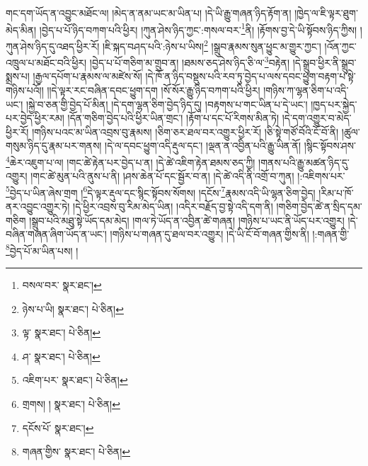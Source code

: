 གང་དག་ཡོད་ན་འབྱུང་མཐོང་ལ། །མེད་ན་ནམ་ཡང་མ་ཡིན་པ། །དེ་ཡི་རྒྱུ་གཞན་ཉིད་རྟོག་ན། །ཁྱེད་ལ་ཇི་ལྟར་ཐུག་མེད་མིན། །བྱེད་པ་པོ་ཉིད་བཀག་པའི་ཕྱིར། །ཀུན་ཤེས་ཉིད་ཀྱང་:གསལ་བར་\footnote{བསལ་བར་  སྣར་ཐང་། }ནི། །རྟོགས་བྱ་དེ་ཡི་སྟོབས་ཉིད་ཀྱིས། །ཀུན་ཤེས་ཉིད་དུ་འཐད་ཕྱིར་རོ། །ཇི་སྐད་བཤད་པའི་:ཉེས་པ་ཡིས།\footnote{ཉེས་པ་ཡི།  སྣར་ཐང་།  པེ་ཅིན། } །སྒྲུབ་རྣམས་སུན་ཕྱུང་མ་གྱུར་ཀྱང་། །འོན་ཀྱང་འཁྲུལ་པ་མཐོང་བའི་ཕྱིར། །བྱེད་པ་པོ་གཅིག་མ་གྲུབ་ན། །ཐམས་ཅད་ཤེས་ཉིད་ཅི་ལ་\footnote{ལྟ་  སྣར་ཐང་།  པེ་ཅིན། }བརྟེན། །དེ་སྒྲུབ་ཕྱིར་ནི་སྒྲུབ་སྨྲས་པ། །རྒྱལ་དཔོག་པ་རྣམས་ལ་མཛེས་སོ། །དེ་ཁོ་ན་ཉིད་བསྡུས་པའི་རབ་ཏུ་བྱེད་པ་ལས་དབང་ཕྱུག་བརྟག་པ་སྟེ་གཉིས་པའོ།། །།དེ་ལྟར་རང་བཞིན་དབང་ཕྱུག་དག །སོ་སོར་རྒྱུ་ཉིད་བཀག་པའི་ཕྱིར། །གཉིས་ཀ་ལྷན་ཅིག་པ་འདི་ཡང་། །སྐྱེ་བ་ཅན་གྱི་བྱེད་པོ་མིན། །དེ་དག་ལྷན་ཅིག་བྱེད་ཉིད་དུ། །བརྟགས་པ་གང་ཡིན་པ་དེ་ཡང་། །ཁྱད་པར་སྐྱེད་པར་བྱེད་ཕྱིར་རམ། །དོན་གཅིག་བྱེད་པའི་ཕྱིར་ཡིན་གྲང་། །རྟོག་པ་དང་པོ་རིགས་མིན་ཏེ། །དེ་དག་འགྱུར་བ་མེད་ཕྱིར་རོ། །གཉིས་པའང་མ་ཡིན་འབྲས་བུ་རྣམས། །ཅིག་ཅར་ཐལ་བར་འགྱུར་ཕྱིར་རོ། །ཅི་སྟེ་གཙོ་བོའི་ངོ་བོ་ནི། །ཚུལ་གསུམ་ཉིད་དུ་རྣམ་པར་གནས། །དེ་ལ་དབང་ཕྱུག་འདི་རྡུལ་དང་། །ལྡན་ན་འབྱིན་པའི་རྒྱུ་ཡིན་ནོ། །སྙིང་སྟོབས་ཤས་\footnote{ཤ་  སྣར་ཐང་།  པེ་ཅིན། }ཆེར་འཇུག་པ་ལ། །གང་ཚེ་རྟེན་པར་བྱེད་པ་ན། །དེ་ཚེ་འཇིག་རྟེན་ཐམས་ཅད་ཀྱི། །གནས་པའི་རྒྱུ་མཚན་ཉིད་དུ་འགྱུར། །གང་ཚེ་མུན་པའི་ནུས་པ་ནི། །ཤས་ཆེན་པོ་དང་སྦྱོར་བ་ན། །དེ་ཚེ་འདི་ནི་འགྲོ་བ་ཀུན། །:འཇིགས་པར་\footnote{འཇིག་པར་  སྣར་ཐང་།  པེ་ཅིན། }བྱེད་པ་ཡིན་ཞེས་གྲག །\footnote{གྲགས། །  སྣར་ཐང་།  པེ་ཅིན། }དེ་ལྟར་རྡུལ་དང་སྙིང་སྟོབས་སོགས། །དངོས་\footnote{དངོས་པོ་  སྣར་ཐང་། }རྣམས་འདི་ཡི་ལྷན་ཅིག་བྱེད། །རིམ་པ་ཁོ་ནར་འབྱུང་འགྱུར་ཏེ། །དེ་ཕྱིར་འབྲས་བུ་རིམ་མེད་ཡིན། །འདིར་བརྗོད་བྱ་སྟེ་འདི་དག་ནི། །གཅིག་བྱེད་ཚེ་ན་སྲིད་དམ་གཅིག །སྒྲུབ་པའི་མཐུ་སྟེ་ཡོད་དམ་མེད། །གལ་ཏེ་ཡོད་ན་འབྱིན་ཚེ་གཞན། །གཉིས་པ་ཡང་ནི་ཡོད་པར་འགྱུར། །དེ་བཞིན་གཞན་ཞིག་ཡོད་ན་ཡང་། །གཉིས་པ་གཞན་དུ་ཐལ་བར་འགྱུར། །དེ་ཡི་ངོ་བོ་གཞན་གྱིས་ནི། །:གཞན་གྱི་\footnote{གཞན་གྱིས་  སྣར་ཐང་།  པེ་ཅིན། }བྱེད་པོ་མ་ཡིན་པས། །
